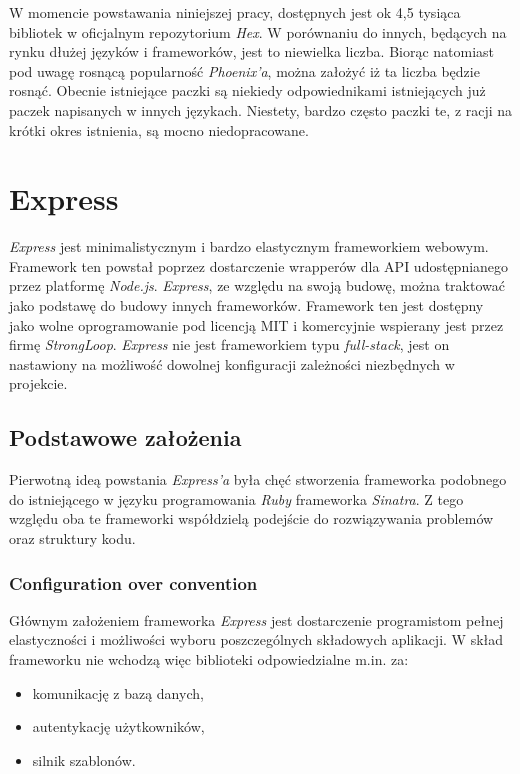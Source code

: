 W momencie powstawania niniejszej pracy, dostępnych jest ok 4,5 tysiąca bibliotek w oficjalnym repozytorium  \textit{Hex}. W porównaniu do innych, będących na rynku dłużej języków i frameworków, jest to niewielka liczba. Biorąc natomiast pod uwagę rosnącą popularność \textit{Phoenix'a}, można założyć iż ta liczba będzie rosnąć. Obecnie istniejące paczki są niekiedy odpowiednikami istniejących już paczek napisanych w innych językach. Niestety, bardzo często paczki te, z racji na krótki okres istnienia, są mocno niedopracowane.

\section{Express}
\textit{Express} jest minimalistycznym i bardzo elastycznym frameworkiem webowym. Framework ten powstał poprzez dostarczenie wrapperów dla API udostępnianego przez platformę \textit{Node.js}. \textit{Express}, ze względu na swoją budowę, można traktować jako podstawę do budowy innych frameworków. Framework ten jest dostępny jako wolne oprogramowanie pod licencją MIT i komercyjnie wspierany jest przez firmę \textit{StrongLoop}. \textit{Express} nie jest frameworkiem typu \textit{full-stack}, jest on nastawiony na możliwość dowolnej konfiguracji zależności niezbędnych w projekcie.

\subsection{Podstawowe założenia}
Pierwotną ideą powstania \textit{Express'a} była chęć stworzenia frameworka podobnego do istniejącego w języku programowania \textit{Ruby} frameworka \textit{Sinatra}. Z tego względu oba te frameworki współdzielą podejście do rozwiązywania problemów oraz struktury kodu.

\subsubsection{Configuration over convention}
Głównym założeniem frameworka \textit{Express} jest dostarczenie programistom pełnej elastyczności i możliwości wyboru poszczególnych składowych aplikacji. W skład frameworku nie wchodzą więc biblioteki odpowiedzialne m.in. za:
\begin{itemize}
  \item komunikację z bazą danych,
  \item autentykację użytkowników,
  \item silnik szablonów.
\end{itemize}

